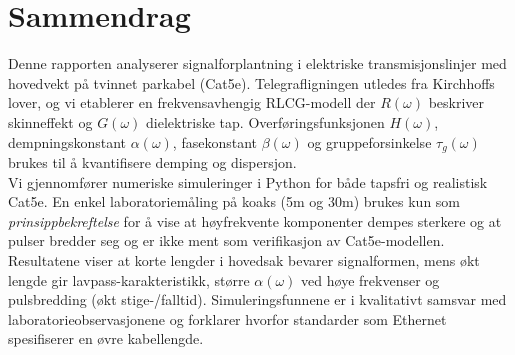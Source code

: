 \section*{Sammendrag}
Denne rapporten analyserer signalforplantning i elektriske transmisjonslinjer med hovedvekt på tvinnet parkabel (Cat5e). Telegrafligningen utledes fra Kirchhoffs lover, og vi etablerer en frekvensavhengig RLCG-modell der \(R(\omega)\) beskriver skinneffekt og \(G(\omega)\) dielektriske tap. Overføringsfunksjonen \(H(\omega)\), dempningskonstant \(\alpha(\omega)\), fasekonstant \(\beta(\omega)\) og gruppeforsinkelse \(\tau_g(\omega)\) brukes til å kvantifisere demping og dispersjon.\\[1em]
Vi gjennomfører numeriske simuleringer i Python for både tapsfri og realistisk Cat5e. En enkel laboratoriemåling på koaks (5m og 30m) brukes kun som \emph{prinsippbekreftelse} for å vise at høyfrekvente komponenter dempes sterkere og at pulser bredder seg og er ikke ment som verifikasjon av Cat5e-modellen.\\[1em]
Resultatene viser at korte lengder i hovedsak bevarer signalformen, mens økt lengde gir lavpass-karakteristikk, større \(\alpha(\omega)\) ved høye frekvenser og pulsbredding (økt stige-/falltid). Simuleringsfunnene er i kvalitativt samsvar med laboratorieobservasjonene og forklarer hvorfor standarder som Ethernet spesifiserer en øvre kabellengde.
